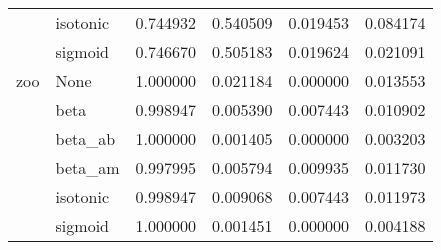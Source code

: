 \begin{tabular}{llrrrr}
        & isotonic &  0.744932 &  0.540509 &  0.019453 &  0.084174 \\
        & sigmoid &  0.746670 &  0.505183 &  0.019624 &  0.021091 \\
zoo & None &  1.000000 &  0.021184 &  0.000000 &  0.013553 \\
        & beta &  0.998947 &  0.005390 &  0.007443 &  0.010902 \\
        & beta\_ab &  1.000000 &  0.001405 &  0.000000 &  0.003203 \\
        & beta\_am &  0.997995 &  0.005794 &  0.009935 &  0.011730 \\
        & isotonic &  0.998947 &  0.009068 &  0.007443 &  0.011973 \\
        & sigmoid &  1.000000 &  0.001451 &  0.000000 &  0.004188 \\
\bottomrule
\end{tabular}
